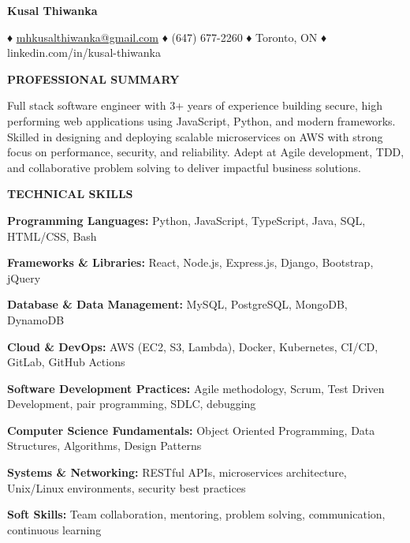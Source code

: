 \documentclass[10pt,letterpaper]{article}
\begin{document}
\begin{center}
{\large\textbf{Kusal Thiwanka}}

\vspace{2pt}

♦ \href{mailto:mhkusalthiwanka@gmail.com}{\underline{mhkusalthiwanka@gmail.com}} ♦ (647) 677-2260 ♦ Toronto, ON ♦ linkedin.com/in/kusal-thiwanka
\end{center}

\vspace{3pt}

\textbf{PROFESSIONAL SUMMARY}

\vspace{1pt}

Full stack software engineer with 3+ years of experience building secure, high performing web applications using JavaScript, Python, and modern frameworks. Skilled in designing and deploying scalable microservices on AWS with strong focus on performance, security, and reliability. Adept at Agile development, TDD, and collaborative problem solving to deliver impactful business solutions.

\vspace{3pt}

\textbf{TECHNICAL SKILLS}

\vspace{1pt}

\textbf{Programming Languages:} Python, JavaScript, TypeScript, Java, SQL, HTML/CSS, Bash

\textbf{Frameworks \& Libraries:} React, Node.js, Express.js, Django, Bootstrap, jQuery

\textbf{Database \& Data Management:} MySQL, PostgreSQL, MongoDB, DynamoDB

\textbf{Cloud \& DevOps:} AWS (EC2, S3, Lambda), Docker, Kubernetes, CI/CD, GitLab, GitHub Actions

\textbf{Software Development Practices:} Agile methodology, Scrum, Test Driven Development, pair programming, SDLC, debugging

\textbf{Computer Science Fundamentals:} Object Oriented Programming, Data Structures, Algorithms, Design Patterns

\textbf{Systems \& Networking:} RESTful APIs, microservices architecture, Unix/Linux environments, security best practices

\textbf{Soft Skills:} Team collaboration, mentoring, problem solving, communication, continuous learning

\vspace{3pt}
\end{document}

